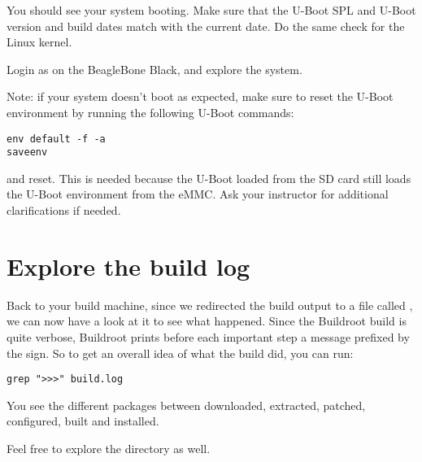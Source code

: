 You should see your system booting. Make sure that the U-Boot SPL and
U-Boot version and build dates match with the current date. Do the
same check for the Linux kernel.

Login as  on the BeagleBone Black, and explore the system.

Note: if your system doesn't boot as expected, make sure to reset the
U-Boot environment by running the following U-Boot commands:

\begin{verbatim}
env default -f -a
saveenv
\end{verbatim}

and reset. This is needed because the U-Boot loaded from the SD card
still loads the U-Boot environment from the eMMC. Ask your instructor
for additional clarifications if needed.

\section{Explore the build log}

Back to your build machine, since we redirected the build output to a
file called , we can now have a look at it to see what
happened. Since the Buildroot build is quite verbose, Buildroot prints
before each important step a message prefixed by the \code{>>>}
sign. So to get an overall idea of what the build did, you can run:

\begin{verbatim}
grep ">>>" build.log
\end{verbatim}

You see the different packages between downloaded, extracted, patched,
configured, built and installed.

Feel free to explore the  directory as well.
